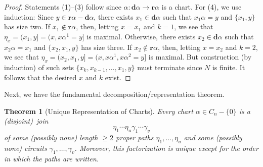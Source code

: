 \documentclass{surv-l}
\numberwithin{equation}{section}
\numberwithin{table}{section}
\numberwithin{figure}{section}
\theoremstyle{plain}
\newtheorem{theorem}[equation]{Theorem}
\theoremstyle{definition}
\begin{document}
\begin{proof} Statements (1)--(3) follow since $\alpha :
\mathbf{d}\alpha\rightarrow \mathbf{r}\alpha$ is a chart. For
(4), we use induction: Since $y\in
\mathbf{r}\alpha-\mathbf{d}\alpha$, there exists $ x_{1}\in
\mathbf{d}\alpha$ such that $x_{1}\alpha=y$ and $\{x_{1},y\}$
has size two. If $x_{1}\not\in \mathbf{r}\alpha$, then,
letting $x=x_{1}$ and $k=1$, we see that $\eta_{x}=(x_{1},
y]=(x,x\alpha^{1}=y]$ is maximal. Otherwise, there exists
$x_{2}\in \mathbf{d}\alpha$ such that $x_{2}\alpha=x_{1}$ and
$\{x_{2},x_{1},y\}$ has size three. If $ x_{2}\not\in
\mathbf{r}\alpha$, then, letting $x=x_{2}$ and $k=2$, we see
that $\eta_{x}=(x_{2}, x_{1},y]=(x,x\alpha^{1},x\alpha^{2}=y]$
is maximal. But construction (by induction) of such sets
$\{x_{k},x_{k-1},\ldots, x_{1},y\}$ must terminate since $N$
is finite. It follows that the desired $x$ and $k$ exist.
\end{proof}

Next, we have the fundamental decomposition/representation
theorem.

\begin{theorem}[Unique Representation of Charts]\label{thm1.3.2}
Every chart $\alpha\in C_{n}-\{0\}$ is a (disjoint)~join
\[
\eta_{1}\cdots\eta_{u}\gamma_{1}\cdots\gamma_{v}
\]
of some (possibly none) length $\geq 2$ proper paths
$\eta_{1},\ldots, \eta_{u}$ and some (possibly none)
circuits $\gamma_{1},\ldots, \gamma_{v}$. Moreover, this
factorization is unique except for the order in which the
paths are written.
\end{theorem}
\end{document}
